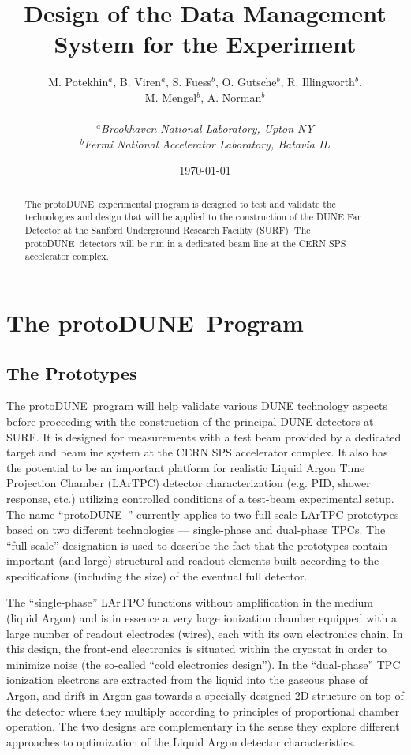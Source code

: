 \documentclass[pdftex,12pt,letter]{article}
\title{Design of the Data Management System for the \pd Experiment}
\date{\today}
\author{M. Potekhin$^a$, B. Viren$^a$, S. Fuess$^b$, O. Gutsche$^b$, R. Illingworth$^b$,\\M. Mengel$^b$,
 A. Norman$^b$\\
\ \\
$^a$\textit{Brookhaven National Laboratory, Upton NY}\\
$^b$\textit{Fermi National Accelerator Laboratory, Batavia IL}}
\newcommand{\pd}{protoDUNE\ }
\begin{document}
\maketitle

\tableofcontents
\newpage
\begin{abstract}
The \pd experimental program is designed to test and validate the technologies and design that will be applied to the construction
of the DUNE Far Detector at the Sanford Underground Research Facility (SURF).  The \pd detectors will be run in a dedicated beam line
at the CERN SPS accelerator complex. 
\end{abstract}


\section{The \pd Program}
\label{S:1}
\subsection{The Prototypes}
The \pd program will help validate various DUNE technology aspects before proceeding with the construction of the principal DUNE detectors at SURF.
It is designed for measurements with a test beam provided by a dedicated target and beamline system at the CERN SPS accelerator complex.
It also has the potential to be an important platform for realistic Liquid Argon Time Projection Chamber (LArTPC) detector characterization
(e.g. PID, shower response, etc.) utilizing controlled conditions of a test-beam experimental setup. The name ``\pd'' currently applies to two
full-scale LArTPC prototypes based on two different technologies --- single-phase and dual-phase TPCs.
The ``full-scale'' designation is used to describe the fact that the prototypes
contain important (and large) structural and readout elements built according to the specifications (including the size)
of the eventual full detector.

The ``single-phase''  LArTPC functions without amplification in the medium (liquid Argon) and is in essence a very large ionization chamber
equipped with a large number of readout electrodes (wires), each with its own electronics chain. In this design, the front-end electronics is
situated within the cryostat in order to minimize noise (the so-called ``cold electronics design''). In the ``dual-phase''  TPC ionization
electrons are extracted from the liquid into the gaseous phase of Argon, and drift in Argon gas towards a specially designed 2D structure
on top of the detector where they multiply according to principles of proportional chamber operation. The two designs are complementary
in the sense they explore different approaches to optimization of the Liquid Argon detector characteristics.
\end{document}
